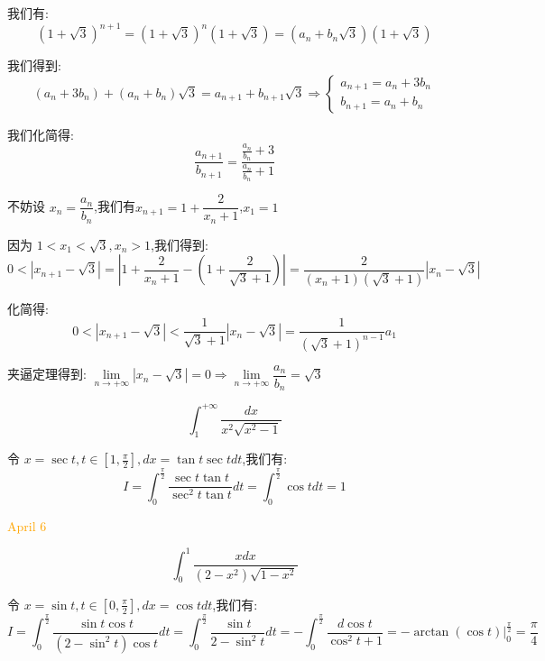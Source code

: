 \begin{solution}
	
	我们有: 
	$$(1+\sqrt{3})^{n+1}=(1+\sqrt{3})^{n}(1+\sqrt{3})=(a_{n}+b_{n}\sqrt{3})(1+\sqrt{3})$$
	
	我们得到: 
	$$(a_{n}+3b_{n})+(a_{n}+b_{n})\sqrt{3}=a_{n+1}+b_{n+1}\sqrt{3}\Rightarrow\left\lbrace\begin{array}{l}
		a_{n+1}=a_{n}+3b_{n}\\b_{n+1}=a_{n}+b_{n}
	\end{array} \right. $$
	
	我们化简得: 
	$$\frac{a_{n+1}}{b_{n+1}}=\frac{\frac{a_{n}}{b_{n}}+3}{\frac{a_{n}}{b_{n}}+1}$$
	
	不妨设 $x_{n}=\dfrac{a_{n}}{b_{n}}$,我们有$x_{n+1}=1+\dfrac{2}{x_{n}+1}$,$x_{1}=1$
	
	因为 $1<x_{1}<\sqrt{3},x_{n}>1$,我们得到: 
	$$0<|x_{n+1}-\sqrt{3}|=|1+\frac{2}{x_{n}+1}-(1+\frac{2}{\sqrt{3}+1})|=\frac{2}{(x_{n}+1)(\sqrt{3}+1)}|x_{n}-\sqrt{3}|$$
	
	化简得: 
	$$0<|x_{n+1}-\sqrt{3}|<\frac{1}{\sqrt{3}+1}|x_{n}-\sqrt{3}|=\frac{1}{(\sqrt{3}+1)^{n-1}}a_{1}$$
	
	夹逼定理得到: $\lim\limits_{n\to +\infty}|x_{n}-\sqrt{3}|=0\Rightarrow \lim\limits_{n\to +\infty}\dfrac{a_{n}}{b_{n}}=\sqrt{3}$
\end{solution}

\begin{example}[][Exam: 30.1.10]
	$$\int_{1}^{+\infty}\dfrac{dx}{x^2\sqrt{x^{2}-1}}$$
\end{example}

\begin{solution}
	
	令 $x=\sec t,t\in [1,\frac{\pi}{2}], dx=\tan t\sec tdt$,我们有: 
	$$I=\int_{0}^{\frac{\pi}{2}}\frac{\sec t\tan t}{\sec^2 t\tan t}dt=\int_{0}^{\frac{\pi}{2}}\cos tdt=1$$	
\end{solution}


\textcolor{orange}{April 6}

\begin{example}[][Exam: 30.1.11]
	$$\int_{0}^{1}\dfrac{xdx}{(2-x^2)\sqrt{1-x^2}}$$
\end{example}

\begin{solution}
	
	令 $x=\sin t,t\in[0,\frac{\pi}{2}],dx=\cos tdt$,我们有: 
	$$I=\int_{0}^{\frac{\pi}{2}}\frac{\sin t\cos t}{(2-\sin^2 t)\cos t}dt
	=\int_{0}^{\frac{\pi}{2}}\frac{\sin t}{2-\sin^2 t}dt=
	-\int_{0}^{\frac{\pi}{2}}\frac{d\cos t}{\cos^2 t+1}=-\arctan(\cos t)|_{0}^{\frac{\pi}{2}}=\frac{\pi}{4}$$
\end{solution}

